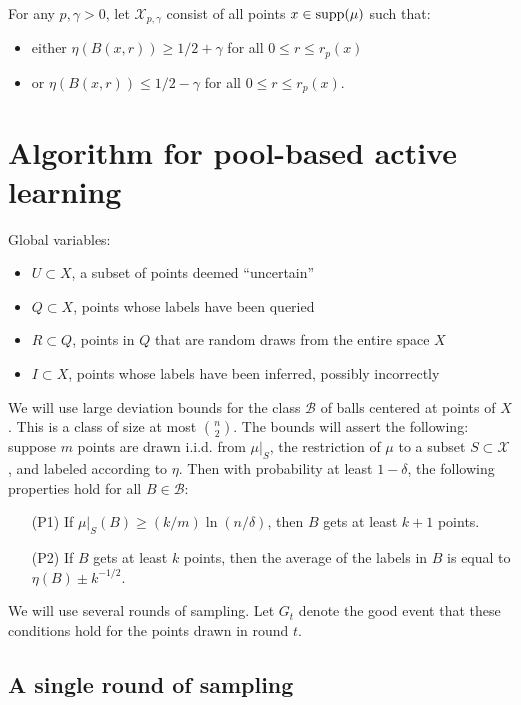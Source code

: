 \documentclass{article}
\def\X{{\mathcal X}}
\def\B{{\mathcal B}}
\def\supp{{\rm supp}}
\begin{document}
For any $p, \gamma> 0$, let $\X_{p, \gamma}$ consist of all points $x \in \supp(\mu)$ such that:
\begin{itemize}
\item either $\eta(B(x,r)) \geq 1/2 + \gamma$ for all $0 \leq r \leq r_p(x)$ 
\item or $\eta(B(x,r)) \leq 1/2 - \gamma$ for all $0 \leq r \leq r_p(x)$.
\end{itemize}


\section{Algorithm for pool-based active learning}

Global variables:
\begin{itemize}
\item $U \subset X$, a subset of points deemed ``uncertain''
\item $Q \subset X$, points whose labels have been queried
\item $R \subset Q$, points in $Q$ that are random draws from the entire space $X$
\item $I \subset X$, points whose labels have been inferred, possibly incorrectly
\end{itemize}

We will use large deviation bounds for the class $\B$ of balls centered at points of $X$. This is a class of size at most ${n \choose 2}$. The bounds will assert the following: suppose $m$ points are drawn i.i.d. from $\mu|_S$, the restriction of $\mu$ to a subset $S \subset \X$, and labeled according to $\eta$. Then with probability at least $1-\delta$, the following properties hold for all $B \in \B$:
\begin{enumerate}
\item[(P1)] If $\mu|_S(B) \geq (k/m) \ln (n/\delta)$, then $B$ gets at least $k+1$ points.
\item[(P2)] If $B$ gets at least $k$ points, then the average of the labels in $B$ is equal to $\eta(B) \pm k^{-1/2}$.
\end{enumerate}
We will use several rounds of sampling. Let $G_t$ denote the good event that these conditions hold for the points drawn in round $t$.

\subsection{A single round of sampling}
\end{document}
